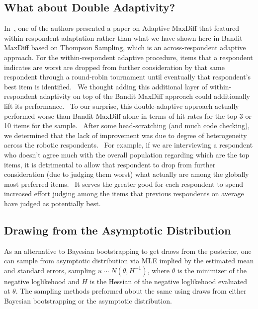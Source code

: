 \documentclass[nonblindrev]{informs3}
\begin{document}
\subsection{What about Double Adaptivity?}
In~\cite{orme2006adaptive}, one of the authors presented a paper on Adaptive MaxDiff that featured within-respondent adaptation rather than what we have shown here in Bandit MaxDiff based on Thompson Sampling, which is an across-respondent adaptive approach. For the within-respondent adaptive procedure, items that a respondent indicates are worst are dropped from further consideration by that same respondent through a round-robin tournament until eventually that respondent's best item is identified.  We thought adding this additional layer of within-respondent adaptivity on top of the Bandit MaxDiff approach could additionally lift its performance.  To our surprise, this double-adaptive approach actually performed worse than Bandit MaxDiff alone in terms of hit rates for the top 3 or 10 items for the sample.  After some head-scratching (and much code checking), we determined that the lack of improvement was due to degree of heterogeneity across the robotic respondents.  For example, if we are interviewing a respondent who doesn't agree much with the overall population regarding which are the top items, it is detrimental to allow that respondent to drop from further consideration (due to judging them worst) what actually are among the globally most preferred items.  It serves the greater good for each respondent to spend increased effort judging among the items that previous respondents on average have judged as potentially best.


\subsection{Drawing from the Asymptotic Distribution}
As an alternative to Bayesian bootstrapping to get draws from the posterior, one can sample from asymptotic distribution via MLE implied by the estimated mean and standard errors, sampling $u \sim N(\theta,H^{-1})$, where $\theta$ is the minimizer of the negative loglikehood and $H$ is the Hessian of the negative loglikehood evaluated at $\theta$. The sampling methods preformed about the same using draws from either Bayesian bootstrapping or the asymptotic distribution.
\end{document}
